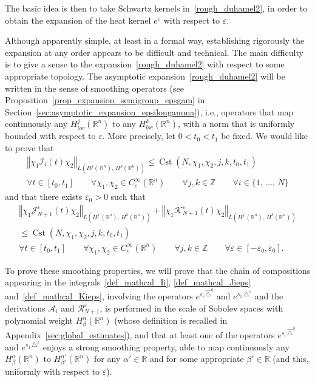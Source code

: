 \documentclass[AHL,Unicode,published]{cedram}
\newcommand*\R{\mathbb{R}}
\newcommand*\Z{\mathbb{Z}}
\newcommand{\calK}{\mathcal{K}}
\newcommand{\calA}{\mathcal{A}}
\newcommand{\calR}{\mathcal{R}}
\newcommand{\calI}{\mathcal{I}}
\newcommand{\calJ}{\mathcal{J}}
\DeclareMathOperator{\Cst}{Cst}
\renewcommand{\leq}{\leqslant}
\let\oldforall\forall
\renewcommand*{\forall}{\mathrel{\oldforall}}
\begin{document}
The basic idea is then to take Schwartz kernels in~\eqref{rough_duhamel2}, in order to obtain the expansion of the heat kernel $e^\varepsilon$ with respect to $\varepsilon$.


Although apparently simple, at least in a formal way, establishing rigorously the expansion at any order appears to be difficult and technical. The main difficulty is to give a sense to the expansion~\eqref{rough_duhamel2} with respect to some appropriate topology. The asymptotic expansion~\eqref{rough_duhamel2} will be written in the sense of smoothing operators (see Proposition~\ref{prop_expansion_semigroup_epsgam} in Section~\ref{sec:asymptotic_expansion_epsilongamma}), i.e., operators that map continuously any $H^j_{loc}(\R^n)$ to any $H^k_{loc}(\R^n)$, with a norm that is uniformly bounded with respect to $\varepsilon$. More precisely, let $0<t_0<t_1$ be fixed. We would like to prove that
\begin{multline}\label{smoothingpropertyIi}
\left\Vert\chi_1\calI_i(t)\chi_2\right\Vert_{L\left(H^j(\,\R^n),\,H^k(\R^n)\right)} \leq \Cst\left(N,\chi_1,\chi_2,j,k,t_0,t_1\right) \\
\forall t\in[t_0,t_1] \qquad \forall \chi_1,\chi_2\in C^\infty_c(\R^n) \qquad\forall j,k\in\Z \qquad \forall i\in\{1,\,\ldots,\,N\}
\end{multline}
and that there exists $\varepsilon_0>0$ such that
\begin{multline}\label{smoothingproperty_JKNeps}
\left\Vert\chi_1\calJ_{N+1}^\varepsilon(t)\chi_2\right\Vert_{L\left(H^j\,(\R^n),\,H^k(\R^n)\right)} +
\left\Vert\chi_1\calK_{N+1}^\varepsilon(t)\chi_2\right\Vert_{L\left(H^j\,(\R^n),\,H^k(\R^n)\right)} \\
\leq \Cst\left(N,\chi_1,\chi_2,j,k,t_0,t_1\right) \\
\forall t\in[t_0,t_1] \qquad \forall \chi_1,\chi_2\in C^\infty_c(\R^n) \qquad\forall j,k\in\Z \qquad\forall\varepsilon\in[-\varepsilon_0,\varepsilon_0].
\end{multline}

To prove these smoothing properties, we will prove that the chain of compositions appearing in the integrals~\eqref{def_mathcal_Ii}, \eqref{def_mathcal_Jieps} and~\eqref{def_mathcal_Kieps}, involving the operators $e^{s_i \,\widehat{\triangle}^{q}}$ and $e^{s_1\,\triangle^\varepsilon}$ and the derivations $\calA_i$ and $\calR_{N+1}^\varepsilon$, is performed in the scale of Sobolev spaces with polynomial weight $H^\alpha_\beta(\R^n)$ (whose definition is recalled in Appendix~\ref{sec:global_estimates}), and that at least one of the operators $e^{s_i\,\widehat{\triangle}^{q}}$ and $e^{s_1\,\triangle^\varepsilon}$ enjoys a strong smoothing property, able to map continuously any $H^\alpha_\beta(\R^n)$ to $H^{\alpha'}_{\beta'}(\R^n)$ for any $\alpha'\in\R$ and for some appropriate $\beta'\in\R$ (and this, uniformly with respect to $\varepsilon$).
\end{document}
